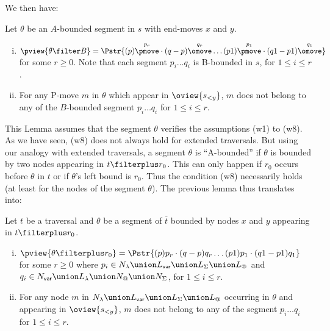 We then have:
\begin{lemma}
Let $\theta$ be an $A$-bounded segment in $s$ with end-moves $x$ and
$y$.

\begin{enumerate}[(i)]
  \item $ \pview{\theta \filter B} = \Pstr{ (p){\stackrel{p_r}\pmove} \cdot (q-p){\stackrel{q_r}\omove} \ldots
                                     (p1){\stackrel{p_1}\pmove}
\cdot (q1-p1){\stackrel{q_1}\omove} }$ for some $r\geq 0$. Note
that each segment $p_i \ldots q_i$ is B-bounded in $s$, for
$1\leq i \leq r$.
  \item For any P-move $m$ in $\theta$ which appear in
$\oview{s_{<y}}$, $m$ does not belong to any of the $B$-bounded
segment $p_i \ldots q_i$ for $1\leq i \leq r$.
\end{enumerate}
\end{lemma}
This Lemma assumes that the segment $\theta$ verifies the
assumptions (w1) to (w8). As we have seen, (w8) does not always hold for extended traversals. But using our analogy with extended traversals, a  segment $\theta$ is ``A-bounded'' if $\theta$ is bounded by two nodes appearing in $t\filterplus r_0$. This can only happen if $r_0$ occurs before $\theta$ in $t$ or if $\theta$'s left bound is $r_0$.  Thus the condition (w8) necessarily holds (at least for the nodes of the segment $\theta$).
The previous lemma thus translates into:
\begin{lemma}
\label{lem:pview_bounded_segment} Let $t$ be a traversal and
$\theta$ be a segment of $\overline{t}$ bounded by nodes $x$ and $y$ appearing in $t\filterplus r_0$.
\begin{enumerate}[(i)]
  \item $ \pview{\theta \filterplus r_0} = \Pstr{ (p){p_r} \cdot (q-p){q_r} \ldots
(p1){p_1} \cdot (q1-p1){q_1} }$ for some $r\geq 0$ where
$p_i \in N_\lambda \union L_{\sf var} \union L_\Sigma \union
L_@$ and $q_i \in N_{\sf var} \union L_\lambda \union N_@
\union N_\Sigma$, for $1\leq i \leq r$.
  \item For any node $m$ in $N_\lambda \union L_{\sf var} \union L_\Sigma \union L_@$ occurring in $\theta$ and appearing in
$\oview{s_{<y}}$, $m$ does not belong to any of the
segment $p_i \ldots q_i$ for $1\leq i \leq r$.
\end{enumerate}
\end{lemma}
